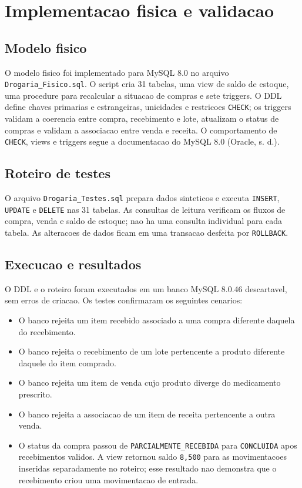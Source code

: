 \documentclass[12pt,a4paper]{article}
\begin{document}
\section{Implementacao fisica e validacao}
\label{sec:implementacao-validacao}

\subsection{Modelo fisico}
O modelo fisico foi implementado para MySQL 8.0 no arquivo \texttt{Drogaria\_Fisico.sql}. O script cria 31 tabelas, uma view de saldo de estoque, uma procedure para recalcular a situacao de compras e sete triggers. O DDL define chaves primarias e estrangeiras, unicidades e restricoes \texttt{CHECK}; os triggers validam a coerencia entre compra, recebimento e lote, atualizam o status de compras e validam a associacao entre venda e receita. O comportamento de \texttt{CHECK}, views e triggers segue a documentacao do MySQL 8.0 (Oracle, s. d.).

\subsection{Roteiro de testes}
O arquivo \texttt{Drogaria\_Testes.sql} prepara dados sinteticos e executa \texttt{INSERT}, \texttt{UPDATE} e \texttt{DELETE} nas 31 tabelas. As consultas de leitura verificam os fluxos de compra, venda e saldo de estoque; nao ha uma consulta individual para cada tabela. As alteracoes de dados ficam em uma transacao desfeita por \texttt{ROLLBACK}.

\subsection{Execucao e resultados}
O DDL e o roteiro foram executados em um banco MySQL 8.0.46 descartavel, sem erros de criacao. Os testes confirmaram os seguintes cenarios:

\begin{itemize}
\item O banco rejeita um item recebido associado a uma compra diferente daquela do recebimento.
\item O banco rejeita o recebimento de um lote pertencente a produto diferente daquele do item comprado.
\item O banco rejeita um item de venda cujo produto diverge do medicamento prescrito.
\item O banco rejeita a associacao de um item de receita pertencente a outra venda.
\item O status da compra passou de \texttt{PARCIALMENTE\_RECEBIDA} para \texttt{CONCLUIDA} apos recebimentos validos. A view retornou saldo \texttt{8,500} para as movimentacoes inseridas separadamente no roteiro; esse resultado nao demonstra que o recebimento criou uma movimentacao de entrada.
\end{itemize}
\end{document}
